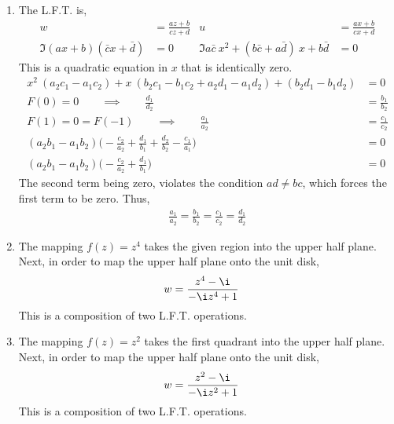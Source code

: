 \begin{enumerate}
    \item The L.F.T. is,
          \begin{align}
              w                               & = \frac{az + b}{cz + d} &
              u                               & = \frac{ax + b}{cx + d}   \\
              \Im{(ax+b)(\bar{c}x + \bar{d})} & = 0                     &
              \Im a\bar{c}\ x^2 + (b\bar{c} + a\bar{d})\ x
              + b\bar{d}                      & = 0
          \end{align}
          This is a quadratic equation in $ x $ that is identically zero.
          \begin{align}
              x^2\ (a_2c_1 - a_1c_2) + x\ (b_2c_1 - b_1c_2 + a_2d_1 - a_1d_2)
              + (b_2d_1 - b_1d_2)                       & = 0               \\
              F(0) = 0 \qquad \implies \qquad
              \frac{d_1}{d_2}                           & = \frac{b_1}{b_2} \\
              F(1) = 0 = F(-1) \qquad \implies \qquad
              \frac{a_1}{a_2}                           & = \frac{c_1}{c_2} \\
              (a_2b_1 - a_1b_2)\Bigg(-\frac{c_2}{a_2} + \frac{d_1}{b_1}
              + \frac{d_2}{b_2} - \frac{c_1}{a_1}\Bigg) & = 0               \\
              (a_2b_1 - a_1b_2)\Bigg(-\frac{c_2}{a_2} + \frac{d_1}{b_1}
              \Bigg)                                    & = 0
          \end{align}
          The second term being zero, violates the condition $ ad \neq bc $, which
          forces the first term to be zero. Thus,
          \begin{align}
              \frac{a_1}{a_2} = \frac{b_1}{b_2} = \frac{c_1}{c_2} = \frac{d_1}{d_2}
          \end{align}

    \item The mapping $ f(z) = z^4 $ takes the given region into the upper half
          plane. Next, in order to map the upper half plane onto the unit disk,
          \begin{align}
              w & = \frac{z^4 - \i}{-\i z^4 + 1}
          \end{align}
          This is a composition of two L.F.T. operations.

    \item The mapping $ f(z) = z^2 $ takes the first quadrant into the upper half
          plane. Next, in order to map the upper half plane onto the unit disk,
          \begin{align}
              w & = \frac{z^2 - \i}{-\i z^2 + 1}
          \end{align}
          This is a composition of two L.F.T. operations.
\end{enumerate}